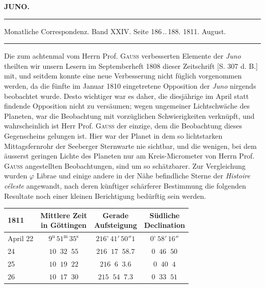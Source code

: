 \clearpage{}\hypertarget{native-335-lower}{}\label{native-335-lower}
\begin{center}\textbf{JUNO.}\par\vspace{4pt}\hrule\vspace{4pt}\fontsize{10}{12}\selectfont Monatliche Correspondenz. Band XXIV. Seite 186\,..\,188. 1811. August.\par\vspace{4pt}\hrule\vspace{4pt}\end{center}

\par\indent Die zum achtenmal vom Herrn Prof. \textsc{Gauss} verbesserten Elemente der \emph{Juno} theilten wir unsern Lesern im Septemberheft 1808 dieser Zeitschrift [S. 307 d. B.] mit, und seitdem konnte eine neue Verbesserung nicht füglich vorgenommen werden, da die fünfte im Januar 1810 eingetretene Opposition der \emph{Juno} nirgends beobachtet wurde. Desto wichtiger war es daher, die diesjährige im April statt findende Opposition nicht zu versäumen; wegen ungemeiner Lichtschwäche des Planeten, war die Beobachtung mit vorzüglichen Schwierigkeiten verknüpft, und wahrscheinlich ist Herr Prof. \textsc{Gauss} der einzige, dem die Beobachtung dieses Gegenscheins gelungen ist. Hier war der Planet in dem so lichtstarken Mittagsfernrohr der Seeberger Sternwarte nie sichtbar, und die wenigen, bei dem äusserst geringen Lichte des Planeten nur am Kreis-Micrometer von Herrn Prof. \textsc{Gauss} angestellten Beobachtungen, sind um so schätzbarer. Zur Vergleichung wurden $\varphi$ Librae und einige andere in der Nähe befindliche Sterne der \emph{Histoire céleste} angewandt, nach deren künftiger schärferer Bestimmung die folgenden Resultate noch einer kleinen Berichtigung bedürftig sein werden.
\begin{center}\fontsize{10}{12}\selectfont\setlength{\tabcolsep}{4pt}\renewcommand{\arraystretch}{1.15}
\begin{tabular}{l|c|c|c}
1811 & \shortstack{Mittlere Zeit\\in Göttingen} & \shortstack{Gerade\\Aufsteigung} & \shortstack{Südliche\\Declination} \\
\hline
April 22 & $9^{\mathrm u}\,51^{\mathrm m}\,35^{\mathrm s}$ & $216^\circ\,41'\,50''1$ & $0^\circ\,58'\,16''$ \\
\phantom{April }24 & $10\;\;32\;\;55$ & $216\;\;17\;\;58.7$ & $0\;\;46\;\;50$ \\
\phantom{April }25 & $10\;\;19\;\;22$ & $216\;\;6\;\;3.6$ & $0\;\;40\;\;4$ \\
\phantom{April }26 & $10\;\;17\;\;30$ & $215\;\;54\;\;7.3$ & $0\;\;33\;\;51$ \\
\end{tabular}
\end{center}

